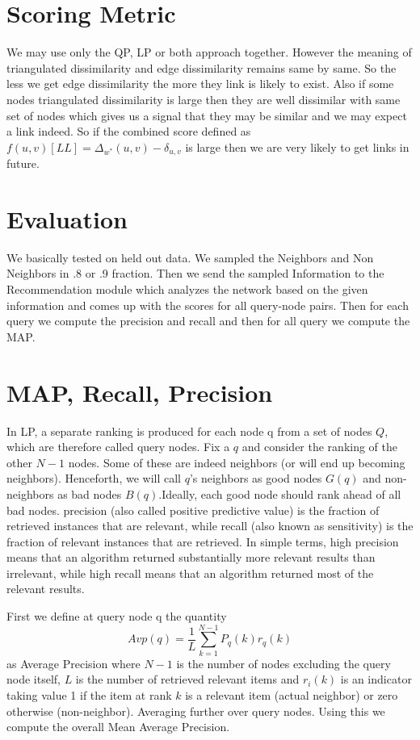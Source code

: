 \section*{Scoring Metric}
We may use only the QP, LP or both approach together. However the meaning of triangulated dissimilarity and edge dissimilarity remains same by same. So the less we get edge dissimilarity the more they link is likely to exist. Also if some nodes triangulated dissimilarity is large then they are well dissimilar with same set of nodes which gives us a signal that they may be similar and we may expect a link indeed. So if the combined score defined as 
$f(u,v)[LL] = \Delta_{w^{*}}(u,v) - \delta_{u,v}$ is large then we are very likely to get links in future.

\section*{Evaluation}
We basically tested on held out data. We sampled the Neighbors and Non Neighbors in .8 or .9 fraction. Then we send the sampled Information to the Recommendation module which analyzes the network based on the given information and comes up with the scores for all query-node pairs. Then for each query we compute the precision and recall and then for all query we compute the MAP.

\section*{MAP, Recall, Precision }
In LP, a separate ranking is produced for each node q from a set of nodes $Q$, which are  therefore called query nodes. Fix a $q$ and consider the ranking of the other $N - 1$ nodes. Some of these are indeed neighbors (or will end up becoming neighbors). Henceforth, we will call $q$’s neighbors as good nodes $G(q)$ and non-neighbors as bad nodes $B(q)$.Ideally, each good node should rank ahead of all bad nodes. precision (also called positive predictive value) is the fraction of retrieved instances that are relevant, while recall (also known as sensitivity) is the fraction of relevant instances that are retrieved. In simple terms, high precision means that an algorithm returned substantially more relevant results than irrelevant, while high recall means that an algorithm returned most of the relevant results.

First we define at query node q the quantity
\begin{equation}
Avp(q) = \frac{1}{L} \sum_{k = 1}^{N-1} P_{q}(k) r_{q}(k)
\end{equation}
as Average Precision where $N - 1$ is the number of nodes excluding the query node itself, $L$ is the number of retrieved relevant items and $r_{i} (k)$ is an indicator taking value 1 if the item at rank $k$ is a relevant item (actual neighbor) or zero otherwise (non-neighbor). Averaging further over query nodes. Using this we compute the overall Mean Average Precision.

